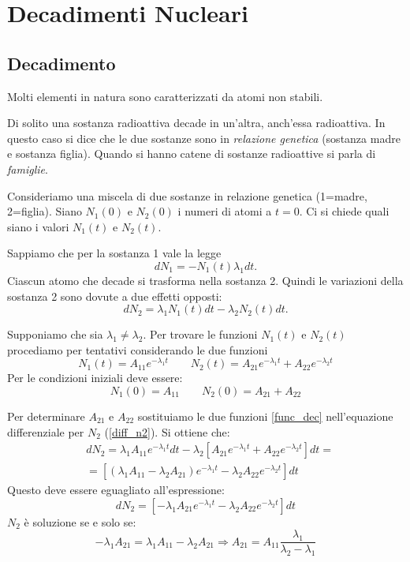 \chapter{Decadimenti Nucleari}
\section{Decadimento}
Molti elementi in natura sono caratterizzati da atomi non stabili.

Di solito una sostanza radioattiva decade in un'altra, anch'essa radioattiva.
In questo caso si dice che le due sostanze sono in \textit{relazione genetica}
(sostanza madre e sostanza figlia).
Quando si hanno catene di sostanze radioattive si parla di \textit{famiglie}.

Consideriamo una miscela di due sostanze in relazione genetica (1=madre, 2=figlia).
Siano $N_1(0)$ e $N_2(0)$ i numeri di atomi a $t=0$. Ci si chiede quali siano i
valori $N_1(t)$ e $N_2(t)$.

Sappiamo che per la sostanza 1 vale la legge
\begin{equation}
dN_1=-N_1(t)\lambda_1dt.
\end{equation}
Ciascun atomo che decade si trasforma nella sostanza 2.
Quindi le variazioni della sostanza 2 sono dovute a due effetti opposti:
\begin{equation}
\label{diff_n2}
dN_2=\lambda_1 N_1(t)dt-\lambda_2 N_2(t)dt.
\end{equation}

Supponiamo che sia $\lambda_1\neq\lambda_2$. Per trovare le funzioni $N_1(t)$ e $N_2(t)$
procediamo per tentativi considerando le due funzioni
\begin{equation}
\label{func_dec}
N_1(t)=A_{11}e^{-\lambda_1t}\qquad N_2(t)=A_{21}e^{-\lambda_1t}+A_{22}e^{-\lambda_2t}
\end{equation}
Per le condizioni iniziali deve essere:
\[
N_1(0)=A_{11}\qquad N_2(0)=A_{21}+A_{22}
\]

Per determinare $A_{21}$ e $A_{22}$ sostituiamo le due funzioni \eqref{func_dec}
nell'equazione differenziale per $N_2$ (\eqref{diff_n2}). Si ottiene che:
\begin{align*}
&dN_2=\lambda_1A_{11}e^{-\lambda_1t}dt-\lambda_2[A_{21}e^{-\lambda_1t}+A_{22}e^{-\lambda_2t}]dt=\\
&=[(\lambda_1A_{11}-\lambda_2A_{21})e^{-\lambda_1t}-\lambda_2A_{22}e^{-\lambda_2t}]dt
\end{align*}
Questo deve essere eguagliato all'espressione:
\[
dN_2=[-\lambda_1A_{21}e^{-\lambda_1t}-\lambda_2A_{22}e^{-\lambda_2t}]dt
\]
$N_2$ è soluzione se e solo se:
\[
-\lambda_1A_{21}=\lambda_1A_{11}-\lambda_2A_{21}\Rightarrow A_{21}=A_{11}\frac{\lambda_1}{\lambda_2-\lambda_1}
\]

